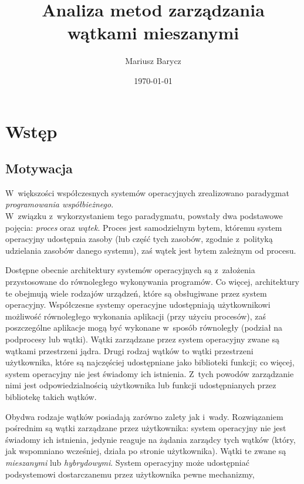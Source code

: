 \documentclass[12pt]{mwart}
\author{Mariusz Barycz}
\title{Analiza metod zarządzania wątkami mieszanymi}
\date{\today}
\begin{document}
 


\maketitle
\thispagestyle{empty}

\newpage
\tableofcontents
\thispagestyle{empty}
\newpage

\section{Wstęp}
%
\subsection{Motywacja}
\indent
  W~większości współczesnych systemów operacyjnych zrealizowano paradygmat \emph{programowania współbieżnego}.\\
  W~związku z~wykorzystaniem tego paradygmatu, powstały dwa podstawowe pojęcia: \emph{proces} oraz \emph{wątek}.
  Proces jest samodzielnym bytem, któremu system operacyjny udostępnia zasoby (lub część tych zasobów, zgodnie z~polityką udzielania zasobów
  danego systemu), zaś wątek jest bytem zależnym od procesu.
\par
%
\indent
	Dostępne obecnie architektury systemów operacyjnych są z~założenia przystosowane do równoległego
	wykonywania programów. Co więcej, architektury te obejmują wiele rodzajów urządzeń, które są obsługiwane przez system operacyjny.
	Współczesne systemy operacyjne udostępniają użytkownikowi możliwość równoległego wykonania aplikacji (przy użyciu procesów),
	zaś poszczególne aplikacje mogą być wykonane w~sposób równoległy (podział na podprocesy lub wątki). Wątki zarządzane przez system operacyjny
	zwane są wątkami przestrzeni jądra.
	Drugi rodzaj wątków to wątki przestrzeni użytkownika, które są najczęściej udostępniane jako biblioteki funkcji; co więcej, system operacyjny
	nie jest świadomy ich istnienia. Z~tych powodów zarządzanie nimi jest odpowiedzialnością użytkownika lub funkcji udostępnianych przez
	bibliotekę takich wątków.
\par
%
\indent
	Obydwa rodzaje wątków posiadają zarówno zalety jak i~wady. Rozwiązaniem pośrednim są wątki zarządzane przez użytkownika:
  system operacyjny nie jest świadomy ich istnienia, jedynie reaguje na żądania zarządcy tych wątków (który, jak wspomniano wcześniej,
  działa po stronie użytkownika). Wątki te zwane są \emph{mieszanymi} lub \emph{hybrydowymi}. 
  System operacyjny może udostępniać podsystemowi dostarczanemu przez użytkownika pewne mechanizmy,
\end{document}
